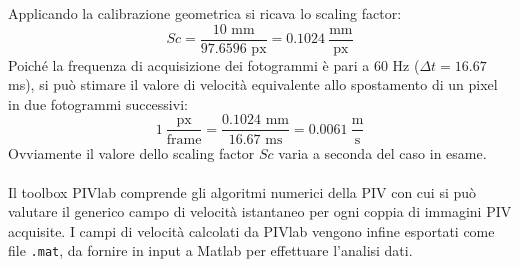 \noindent Applicando la calibrazione geometrica si ricava lo scaling factor:
\begin{equation*}
    Sc = \frac{10\text{ mm}}{97.6596\text{ px}} = 0.1024\ \frac{\text{mm}}{\text{px}}
\end{equation*}
Poiché la frequenza di acquisizione dei fotogrammi è pari a 60 Hz ($\Delta t = 16.67$ ms), si può stimare il valore di velocità equivalente allo spostamento di un pixel in due fotogrammi successivi:
\begin{equation*}
    1\   \frac{\text{px}}{\text{frame}} = \frac{0.1024 \text{ mm}}{16.67 \text{ ms}} = 0.0061\ \frac{\text{m}}{\text{s}}
\end{equation*}
Ovviamente il valore dello scaling factor $Sc$ varia a seconda del caso in esame.\\\\
Il toolbox PIVlab comprende gli algoritmi numerici della PIV con cui si può valutare il generico campo di velocità istantaneo per ogni coppia di immagini PIV acquisite. I campi di velocità calcolati da PIVlab vengono infine esportati come file \texttt{.mat}, da fornire in input a Matlab per effettuare l'analisi dati.

\newpage
